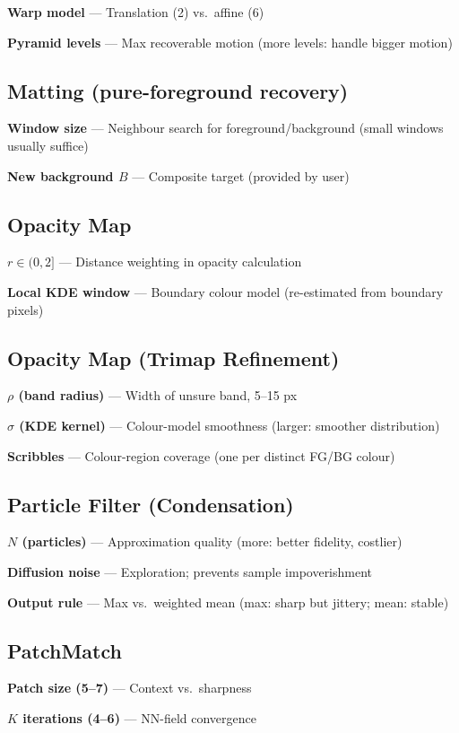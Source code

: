 \documentclass[10pt]{article}
\begin{document}
\textbf{Warp model} --- Translation (2) vs.\ affine (6)

\textbf{Pyramid levels} --- Max recoverable motion (more levels: handle bigger motion)

\subsection*{Matting (pure-foreground recovery)}
\textbf{Window size} --- Neighbour search for foreground/background (small windows usually suffice)

\textbf{New background $B$} --- Composite target (provided by user)

\subsection*{Opacity Map}
\textbf{$r \in (0,2]$} --- Distance weighting in opacity calculation

\textbf{Local KDE window} --- Boundary colour model (re-estimated from boundary pixels)

\subsection*{Opacity Map (Trimap Refinement)}
\textbf{$\rho$ (band radius)} --- Width of unsure band, 5--15 px

\textbf{$\sigma$ (KDE kernel)} --- Colour-model smoothness (larger: smoother distribution)

\textbf{Scribbles} --- Colour-region coverage (one per distinct FG/BG colour)

\subsection*{Particle Filter (Condensation)}
\textbf{$N$ (particles)} --- Approximation quality (more: better fidelity, costlier)

\textbf{Diffusion noise} --- Exploration; prevents sample impoverishment

\textbf{Output rule} --- Max vs.\ weighted mean (max: sharp but jittery; mean: stable)

\subsection*{PatchMatch}
\textbf{Patch size (5--7)} --- Context vs.\ sharpness

\textbf{$K$ iterations (4--6)} --- NN-field convergence
\end{document}
